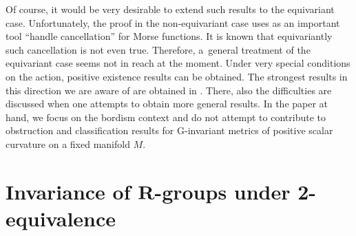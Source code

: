 	Of course, it would be very desirable to extend such results to the
	equivariant case. Unfortunately, the proof in the non-equivariant case uses as
	an important tool ``handle cancellation'' for Morse functions. It is known
	that equivariantly such cancellation is not even true. Therefore, a~general
	treatment of the equivariant case seems not in reach at the moment. Under very
	special conditions on the action, positive existence results can be
	obtained. The strongest results in this direction we are aware of are obtained
	in \cite{Hanke}. There, also the difficulties are discussed when one attempts
	to obtain more general results. In the paper at hand, we focus on the bordism
	context and do not attempt to contribute to obstruction and classification
	results for G-invariant metrics of positive scalar curvature on a fixed
	manifold $M$.
	
\section[Invariance of R-groups under 2-equivalence]{Invariance of $\boldsymbol{R}$-groups under 2-equivalence}
	
